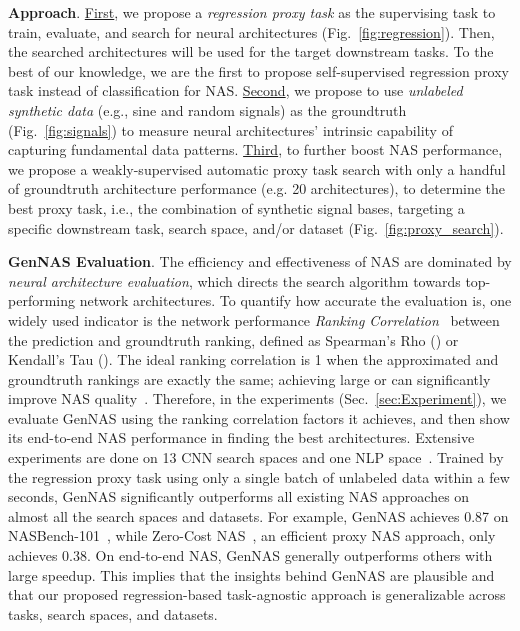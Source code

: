\documentclass{article}
\begin{document}
\textbf{Approach}. \underline{First}, we propose a \textit{regression proxy task} as the supervising task to train, evaluate, and search for neural architectures (Fig.~\ref{fig:regression}). Then, the searched architectures will be used for the target downstream tasks.
To the best of our knowledge, we are the first to propose self-supervised regression proxy task instead of classification for NAS.
\underline{Second}, we propose to use \textit{unlabeled synthetic data} (e.g., sine and random signals) as the groundtruth (Fig.~\ref{fig:signals}) to measure neural architectures' intrinsic capability of capturing fundamental data patterns.
\underline{Third}, to further boost NAS performance, we propose a weakly-supervised automatic proxy task search with only a handful of groundtruth architecture performance (e.g. 20 architectures), to determine the best proxy task, i.e., the combination of synthetic signal bases, targeting a specific downstream task, search space, and/or dataset (Fig.~\ref{fig:proxy_search}).


\textbf{GenNAS Evaluation}.
The efficiency and effectiveness of NAS are dominated by \textit{neural architecture evaluation}, which directs the search algorithm towards  top-performing network architectures.
To quantify how accurate the evaluation is, one widely used indicator is the network performance \textit{Ranking Correlation}~\cite{daniel1990applied} between the prediction and groundtruth ranking, defined as Spearman's Rho () or Kendall's Tau (). 
The ideal ranking correlation is 1 when the approximated and groundtruth rankings are exactly the same; achieving large  or  can significantly improve NAS quality~\cite{zhou2020econas, chu2019fairnas, li2020random}.
Therefore, in the experiments (Sec.~\ref{sec:Experiment}), we evaluate GenNAS using the ranking correlation factors it achieves, and then show its end-to-end NAS performance in finding the best architectures.
Extensive experiments are done on 13 CNN search spaces and one NLP space~\cite{klyuchnikov2020bench}.
Trained by the regression proxy task using only a single batch of unlabeled data within a few seconds, GenNAS significantly outperforms all existing NAS approaches on almost all the search spaces and datasets.
For example, GenNAS achieves 0.87  on NASBench-101~\cite{ying2019bench}, while Zero-Cost NAS~\cite{abdelfattah2021zero}, an efficient proxy NAS approach, only achieves 0.38.
On end-to-end NAS, GenNAS generally outperforms others with large speedup.
This implies that the insights behind GenNAS are plausible and that our proposed regression-based task-agnostic approach is generalizable across tasks, search spaces, and datasets.
\vspace{-5pt}
\end{document}
